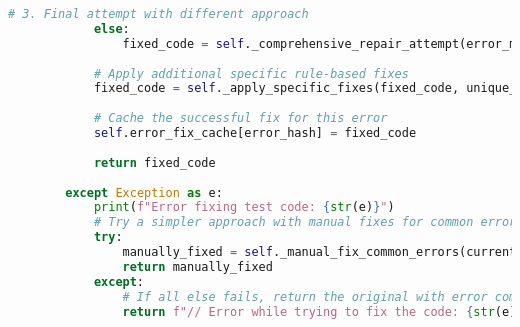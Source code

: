 \begin{lstlisting}[language=Python, caption={$\texttt{Test\_Generator}$ class.}, label={lst:14}]
            # 3. Final attempt with different approach
            else:
                fixed_code = self._comprehensive_repair_attempt(error_message, current_test_code, prediction)
            
            # Apply additional specific rule-based fixes
            fixed_code = self._apply_specific_fixes(fixed_code, unique_errors)
            
            # Cache the successful fix for this error
            self.error_fix_cache[error_hash] = fixed_code
            
            return fixed_code
        
        except Exception as e:
            print(f"Error fixing test code: {str(e)}")
            # Try a simpler approach with manual fixes for common errors
            try:
                manually_fixed = self._manual_fix_common_errors(current_test_code, error_message)
                return manually_fixed
            except:
                # If all else fails, return the original with error comments
                return f"// Error while trying to fix the code: {str(e)}\n// Original error message: {error_message}\n\n{current_test_code}"
    
\end{lstlisting}

